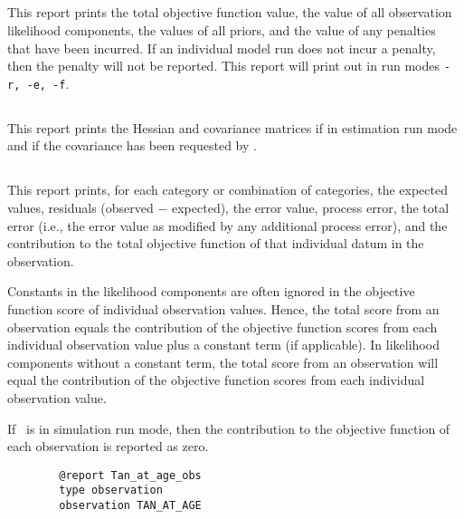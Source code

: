 \subsection{}

This report prints the total objective function value, the value of all observation likelihood components, the values of all priors, and the value of any penalties that have been incurred. If an individual model run does not incur a penalty, then the penalty will not be reported. This report will print out in run modes \texttt{-r, -e, -f}.

\subsection{}

This report prints the Hessian and covariance matrices if in estimation run mode and if the covariance has been requested by .

\subsection{}

This report prints, for each category or combination of categories, the expected values, residuals (observed $-$ expected), the error value, process error, the total error (i.e., the error value as modified by any additional process error), and the contribution to the total objective function of that individual datum in the observation.

Constants in the likelihood components are often ignored in the objective function score of individual observation values. Hence, the total score from an observation equals the contribution of the objective function scores from each individual observation value plus a constant term (if applicable). In likelihood components without a constant term, the total score from an observation will equal the contribution of the objective function scores from each individual observation value.

If \CNAME\ is in simulation run mode, then the contribution to the objective function of each observation is reported as zero.

\begin{verbatim}
		@report Tan_at_age_obs
		type observation
		observation TAN_AT_AGE
\end{verbatim}

